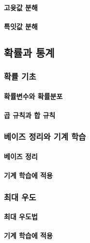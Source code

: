 \documentclass [12pt] {oblivoir}
\let\oldsubsubsection=\subsubsection
\renewcommand{\subsubsection}
{
  \filbreak
  \oldsubsubsection
}
\begin{document}
\paragraph*{고윳값 분해}\mbox{}

\paragraph*{특잇값 분해}\mbox{}

\subsection{확률과 통계}

\subsubsection{확률 기초}

\paragraph*{확률변수와 확률분포}\mbox{}

\paragraph*{곱 규칙과 합 규칙}\mbox{}

\subsubsection{베이즈 정리와 기계 학습}

\paragraph*{베이즈 정리}\mbox{}

\paragraph*{기계 학습에 적용}\mbox{}

\subsubsection{최대 우도}

\paragraph*{최대 우도법}\mbox{}

\paragraph*{기계 학습에 적용}\mbox{}
\end{document}
